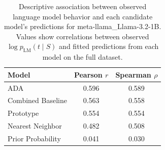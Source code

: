 \begin{table}

\caption{\label{tab:tab:model-correlations}Descriptive association between observed language model behavior and each candidate model's predictions for meta-llama_Llama-3.2-1B. Values show correlations between observed $\log p_{\mathrm{LM}}(t \mid S)$ and fitted predictions from each model on the full dataset.}
\centering
\begin{tabular}[t]{lcc}
\toprule
Model & Pearson $r$ & Spearman $\rho$\\
\midrule
ADA & 0.596 & 0.589\\
Combined Baseline & 0.563 & 0.558\\
Prototype & 0.554 & 0.554\\
Nearest Neighbor & 0.482 & 0.508\\
Prior Probability & 0.041 & 0.030\\
\bottomrule
\end{tabular}
\end{table}
